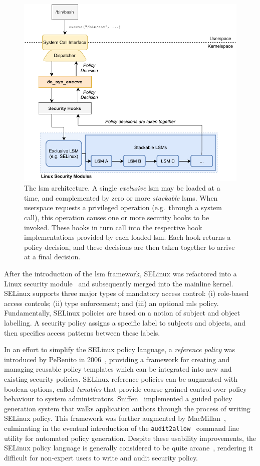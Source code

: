 \begin{figure}[htbp]
  \centering
  \includegraphics[width=0.8\linewidth]{figs/background/lsm.pdf}
  \caption[The LSM architecture]{
    The \gls{lsm} architecture. A single \textit{exclusive} \gls{lsm} may be loaded at a time,
    and complemented by zero or more \textit{stackable} \gls{lsm}s. When userspace
    requests a privileged operation (e.g.~through a system call), this operation causes one
    or more security hooks to be invoked. These hooks in turn call into the respective
    hook implementations provided by each loaded \gls{lsm}. Each hook returns a policy
    decision, and these decisions are then taken together to arrive at a final decision.
  }%
  \label{fig:lsm}
\end{figure}

After the introduction of the \gls{lsm} framework, SELinux was refactored into a Linux
security module~\cite{smalley2001_selinux} and subsequently merged into the mainline
kernel. SELinux supports three major types of mandatory access control: (i) role-based
access controls; (ii) type enforcement; and (iii) an optional \gls{mls} policy.
Fundamentally, SELinux policies are based on a notion of subject and object labelling.
A security policy assigns a specific label to subjects and objects, and then specifies
access patterns between these labels.

In an effort to simplify the SELinux policy language, a \textit{reference policy} was
introduced by PeBenito in 2006~\cite{pebenito2006_refpol}, providing a framework for
creating and managing reusable policy templates which can be integrated into new and
existing security policies. SELinux reference policies can be augmented with boolean
options, called \textit{tunables} that provide coarse-grained control over policy
behaviour to system administrators. Sniffen~\cite{sniffen06_guided} implemented a guided
policy generation system that walks application authors through the process of writing
SELinux policy. This framework was further augmented by
MacMillan~\cite{macmillan07_madison}, culminating in the eventual introduction of the
\texttt{audit2allow}~\cite{audit2allow} command line utility for automated policy
generation. Despite these usability improvements, the SELinux policy language is generally
considered to be quite arcane~\cite{schreuders2012_towards}, rendering it difficult for
non-expert users to write and audit security policy.

